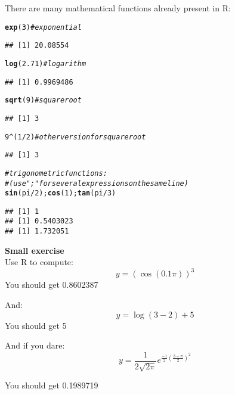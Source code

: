 \documentclass[12pt,a4paper]{scrartcl}\usepackage[]{graphicx}\usepackage[]{color}
\makeatletter
\newcommand{\hlnum}[1]{\textcolor[rgb]{0.686,0.059,0.569}{#1}}%
\newcommand{\hlcom}[1]{\textcolor[rgb]{0.678,0.584,0.686}{\textit{#1}}}%
\newcommand{\hlopt}[1]{\textcolor[rgb]{0,0,0}{#1}}%
\newcommand{\hlstd}[1]{\textcolor[rgb]{0.345,0.345,0.345}{#1}}%
\newcommand{\hlkwd}[1]{\textcolor[rgb]{0.737,0.353,0.396}{\textbf{#1}}}%
\newenvironment{kframe}{%
 \def\at@end@of@kframe{}%
 \ifinner\ifhmode%
  \def\at@end@of@kframe{\end{minipage}}%
  \begin{minipage}{\columnwidth}%
 \fi\fi%
 \def\FrameCommand##1{\hskip\@totalleftmargin \hskip-\fboxsep
 \colorbox{shadecolor}{##1}\hskip-\fboxsep
     \hskip-\linewidth \hskip-\@totalleftmargin \hskip\columnwidth}%
 \MakeFramed {\advance\hsize-\width
   \@totalleftmargin\z@ \linewidth\hsize
   \@setminipage}}%
 {\par\unskip\endMakeFramed%
 \at@end@of@kframe}
\newenvironment{knitrout}{}{} %
\makeatother
\begin{document}
There are many mathematical functions already present in R:
\begin{knitrout}
\color{fgcolor}\begin{kframe}
\begin{alltt}
\hlkwd{exp}\hlstd{(}\hlnum{3}\hlstd{)} \hlcom{#exponential}
\end{alltt}
\begin{verbatim}
## [1] 20.08554
\end{verbatim}
\begin{alltt}
\hlkwd{log}\hlstd{(}\hlnum{2.71}\hlstd{)} \hlcom{#logarithm}
\end{alltt}
\begin{verbatim}
## [1] 0.9969486
\end{verbatim}
\begin{alltt}
\hlkwd{sqrt}\hlstd{(}\hlnum{9}\hlstd{)} \hlcom{#square root}
\end{alltt}
\begin{verbatim}
## [1] 3
\end{verbatim}
\begin{alltt}
\hlnum{9} \hlopt{^} \hlstd{(}\hlnum{1}\hlopt{/}\hlnum{2}\hlstd{)} \hlcom{# other version for square root}
\end{alltt}
\begin{verbatim}
## [1] 3
\end{verbatim}
\begin{alltt}
\hlcom{#trigonometric functions :}
\hlcom{#(use ";" for several expressions on the same line)}
\hlkwd{sin}\hlstd{(pi}\hlopt{/}\hlnum{2}\hlstd{);} \hlkwd{cos}\hlstd{(}\hlnum{1}\hlstd{);} \hlkwd{tan}\hlstd{(pi}\hlopt{/}\hlnum{3}\hlstd{)}
\end{alltt}
\begin{verbatim}
## [1] 1
## [1] 0.5403023
## [1] 1.732051
\end{verbatim}
\end{kframe}
\end{knitrout}

\begin{mdframed}
\textbf{Small exercise}\\
Use R to compute:
$$
  y = (\cos (0.1\pi))^3
$$
You should get 0.8602387

And:
$$
  y = \log (3-2) + 5
$$
You should get 5

And if you dare:
$$
  y = \frac{1}{2\sqrt{2\pi}} e^{\frac{-1}{2} (\frac{3-\pi}{2})^2}
$$

You should get 0.1989719

\end{mdframed}
\end{document}
